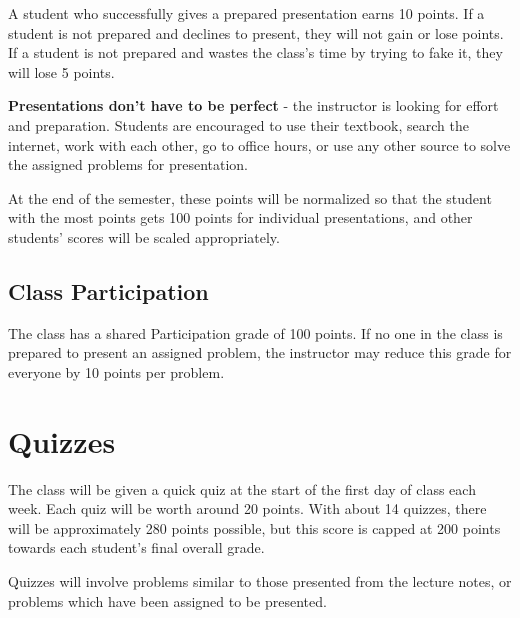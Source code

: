 \documentclass[11pt]{article}
\begin{document}
A student who successfully gives a prepared presentation earns 10 points.
If a student is not prepared and declines to present, they will not gain
or lose points.
If a student is not prepared and wastes the class's time by trying to fake it,
they will lose 5 points.

\textbf{Presentations don't have to be perfect} - the instructor is looking for
effort and preparation.
Students are encouraged to use their textbook, search the internet, work
with each other, go to office hours, or use any other source to solve the
assigned problems for presentation.

At the end of the semester, these points will be normalized so that the
student with the most points gets 100 points for individual presentations,
and other students' scores will be scaled appropriately.

\subsection{Class Participation}

The class has a shared Participation grade of 100 points.
If no one in the class is prepared to present an assigned problem, the
instructor may reduce this grade for everyone by 10 points per problem.


\section{Quizzes}

The class will be given a quick quiz at the start of the first day of class
each week. Each quiz will be worth around 20 points. With about 14 quizzes,
there will be approximately 280 points possible, but this score is capped at
200 points towards each student's final overall grade.

Quizzes will involve problems similar to those presented from the lecture
notes, or problems which have been assigned to be presented.
\end{document}
